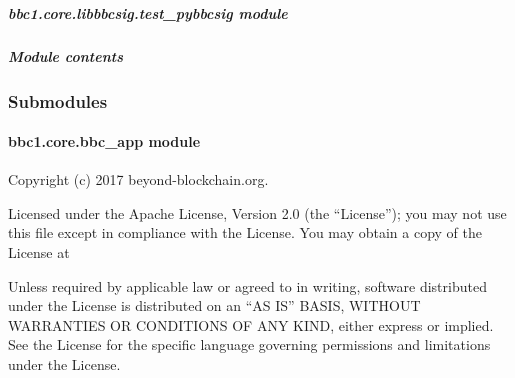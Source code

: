 \documentclass[letterpaper,10pt,english]{sphinxmanual}
\begin{document}
\subparagraph{bbc1.core.libbbcsig.test\_pybbcsig module}
\label{\detokenize{bbc1.core.libbbcsig.test_pybbcsig:bbc1-core-libbbcsig-test-pybbcsig-module}}\label{\detokenize{bbc1.core.libbbcsig.test_pybbcsig::doc}}

\subparagraph{Module contents}
\label{\detokenize{bbc1.core.libbbcsig:module-contents}}\label{\detokenize{bbc1.core.libbbcsig:module-bbc1.core.libbbcsig}}

\subsubsection{Submodules}
\label{\detokenize{bbc1.core:submodules}}

\paragraph{bbc1.core.bbc\_app module}
\label{\detokenize{bbc1.core.bbc_app:bbc1-core-bbc-app-module}}\label{\detokenize{bbc1.core.bbc_app:module-bbc1.core.bbc_app}}\label{\detokenize{bbc1.core.bbc_app::doc}}
Copyright (c) 2017 beyond-blockchain.org.

Licensed under the Apache License, Version 2.0 (the “License”);
you may not use this file except in compliance with the License.
You may obtain a copy of the License at
\begin{quote}

\end{quote}

Unless required by applicable law or agreed to in writing, software
distributed under the License is distributed on an “AS IS” BASIS,
WITHOUT WARRANTIES OR CONDITIONS OF ANY KIND, either express or implied.
See the License for the specific language governing permissions and
limitations under the License.
\end{document}
